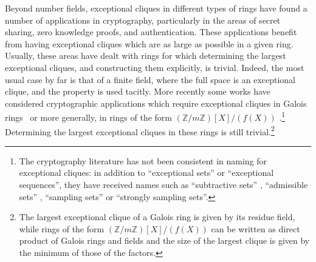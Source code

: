 \documentclass{amsart}
\theoremstyle{plain}
\theoremstyle{definition}
\newcommand{\Z}{\ensuremath{\mathbb{Z}}}
\newcommand{\inote}[1]{\textbf{\color{red}Ignacio: #1}}
\begin{document}
Beyond number fields, exceptional cliques in different types of rings have found a number of applications in cryptography, particularly in the areas of secret sharing, zero knowledge proofs, and authentication. These applications benefit from having  exceptional cliques which are as large as possible in a given ring. Usually, these areas have dealt with rings for which determining the largest exceptional cliques, and constructing them explicitly, is trivial. Indeed, the most usual case by far is that of a finite field, where the full space is an exceptional clique, and the property is used tacitly. More recently some works have considered cryptographic applications which require exceptional cliques in Galois rings~\cite{ACDEY19, DLS20, ACCDE22} or more generally, in rings of the form $(\Z/m\Z)[X]/(f(X))$ \cite{ACK21, AL21, BCFK21, CCKP22, GNS23, BC25}.\footnote{The cryptography literature has not been consistent in naming for exceptional cliques: in addition to ``exceptional sets'' or ``exceptional sequences'', they have received names such as ``subtractive sets'' \cite{AL21}, ``admissible sets'' \cite{CDN15}, ``sampling sets'' \cite{BCFK21, CCKP22} or ``strongly sampling sets''\cite{BC25}.} Determining the largest exceptional cliques in these rings is still trivial.\footnote{The largest exceptional clique of a Galois ring is given by its residue field, while rings of the form $(\Z/m\Z)[X]/(f(X))$ can be written as direct product of Galois rings and fields and the size of the largest clique is given by the minimum of those of the factors.}

\end{document}
